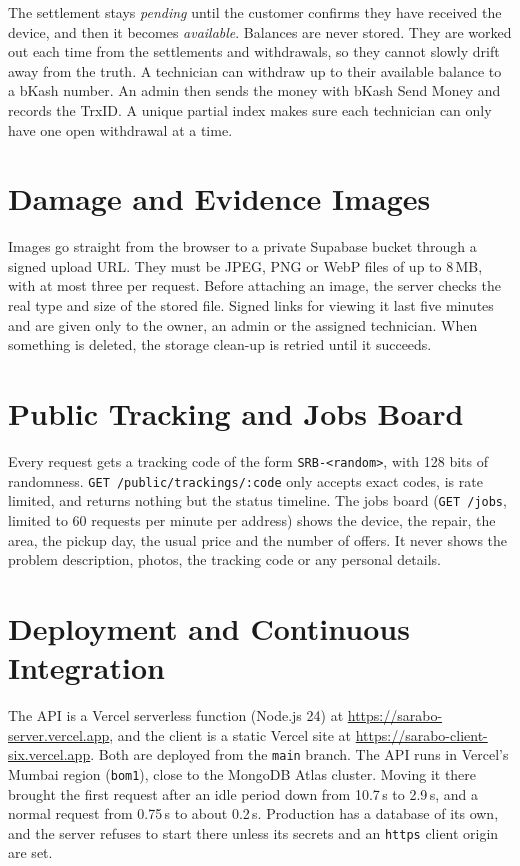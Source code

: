\documentclass{standalone}
\begin{document}
The settlement stays \emph{pending} until the customer confirms they have received the device, and then it becomes \emph{available}. Balances are never stored. They are worked out each time from the settlements and withdrawals, so they cannot slowly drift away from the truth. A technician can withdraw up to their available balance to a bKash number. An admin then sends the money with bKash Send Money and records the TrxID. A unique partial index makes sure each technician can only have one open withdrawal at a time.

\section{Damage and Evidence Images}
Images go straight from the browser to a private Supabase bucket through a signed upload URL. They must be JPEG, PNG or WebP files of up to 8\,MB, with at most three per request. Before attaching an image, the server checks the real type and size of the stored file. Signed links for viewing it last five minutes and are given only to the owner, an admin or the assigned technician. When something is deleted, the storage clean-up is retried until it succeeds.

\section{Public Tracking and Jobs Board}
Every request gets a tracking code of the form \texttt{SRB-<random>}, with 128 bits of randomness. \texttt{GET /public/trackings/:code} only accepts exact codes, is rate limited, and returns nothing but the status timeline. The jobs board (\texttt{GET /jobs}, limited to 60 requests per minute per address) shows the device, the repair, the area, the pickup day, the usual price and the number of offers. It never shows the problem description, photos, the tracking code or any personal details.

\section{Deployment and Continuous Integration}
The API is a Vercel serverless function (Node.js 24) at \url{https://sarabo-server.vercel.app}, and the client is a static Vercel site at \url{https://sarabo-client-six.vercel.app}. Both are deployed from the \texttt{main} branch. The API runs in Vercel's Mumbai region (\texttt{bom1}), close to the MongoDB Atlas cluster. Moving it there brought the first request after an idle period down from 10.7\,s to 2.9\,s, and a normal request from 0.75\,s to about 0.2\,s. Production has a database of its own, and the server refuses to start there unless its secrets and an \texttt{https} client origin are set.
\end{document}
